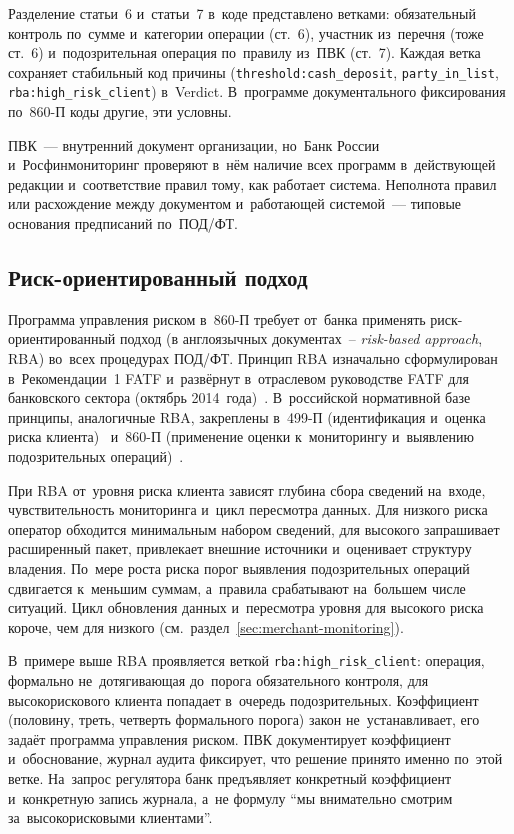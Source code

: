 
Разделение статьи~6 и~статьи~7 в~коде представлено ветками: обязательный
контроль по~сумме и~категории операции (ст.~6), участник из~перечня (тоже
ст.~6) и~подозрительная операция по~правилу из~ПВК (ст.~7).
Каждая ветка сохраняет стабильный код причины (\texttt{threshold:cash\_deposit},
\texttt{party\_in\_list}, \texttt{rba:high\_risk\_client}) в~Verdict. В~программе
документального фиксирования по~860-П коды другие, эти условны.

ПВК~--- внутренний документ организации, но~Банк России и~Росфинмониторинг
проверяют в~нём наличие всех программ в~действующей редакции и~соответствие
правил тому, как работает система. Неполнота правил или расхождение между документом
и~работающей системой~--- типовые основания предписаний по~ПОД/ФТ.

\subsection*{Риск-ориентированный подход}

Программа управления риском в~860-П требует от~банка применять
риск-ориентированный подход (в англоязычных документах~-- \textit{risk-based
approach}, RBA) во~всех процедурах ПОД/ФТ. Принцип RBA изначально сформулирован
в~Рекомендации~1 FATF и~развёрнут в~отраслевом руководстве FATF для банковского
сектора (октябрь 2014~года)~\cite{fatf-recs,fatf-rba}. В~российской нормативной
базе принципы, аналогичные RBA, закреплены в~499-П (идентификация и~оценка риска
клиента)~\cite{cbr-499p} и~860-П (применение оценки к~мониторингу и~выявлению
подозрительных операций)~\cite{cbr-860p}.

При RBA от~уровня риска клиента зависят глубина сбора сведений на~входе,
чувствительность мониторинга и~цикл пересмотра данных. Для низкого
риска оператор обходится минимальным набором сведений, для высокого
запрашивает расширенный пакет, привлекает внешние источники и~оценивает
структуру владения. По~мере роста риска порог выявления подозрительных
операций сдвигается к~меньшим суммам, а~правила срабатывают на~большем числе
ситуаций. Цикл обновления данных и~пересмотра уровня для высокого риска короче,
чем для низкого (см.~раздел~\ref{sec:merchant-monitoring}).

В~примере выше RBA проявляется веткой \texttt{rba:high\_risk\_client}: операция,
формально не~дотягивающая до~порога обязательного контроля, для высокорискового
клиента попадает в~очередь подозрительных. Коэффициент (половину, треть,
четверть формального порога) закон не~устанавливает, его задаёт программа
управления риском. ПВК документирует коэффициент и~обоснование, журнал аудита фиксирует,
что решение принято именно по~этой ветке. На~запрос регулятора банк предъявляет
конкретный коэффициент и~конкретную запись журнала, а~не формулу \enquote{мы
внимательно смотрим за~высокорисковыми клиентами}.

